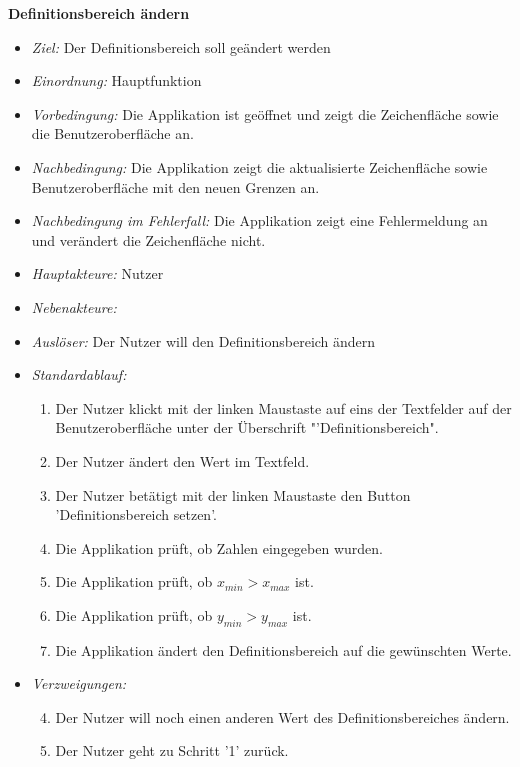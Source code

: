 \textbf{Definitionsbereich \"andern}
  \begin{itemize}
  \item \textit{Ziel:} Der Definitionsbereich soll ge\"andert werden
  \item \textit{Einordnung:}  Hauptfunktion
  \item \textit{Vorbedingung:} Die Applikation ist ge\"offnet und zeigt die Zeichenfl\"ache sowie die Benutzeroberfl\"ache an.
  \item \textit{Nachbedingung:} Die Applikation zeigt die aktualisierte Zeichenfl\"ache sowie Benutzeroberfl\"ache mit den neuen Grenzen an.
  \item \textit{Nachbedingung im Fehlerfall:} Die Applikation zeigt eine Fehlermeldung an und ver\"andert die Zeichenfl\"ache nicht.
  \item \textit{Hauptakteure:} Nutzer
  \item \textit{Nebenakteure:}
  \item \textit{Ausl\"oser:} Der Nutzer will den Definitionsbereich \"andern
  \item \textit{Standardablauf:}
    \begin{enumerate}[label=(\arabic*)]
    \item Der Nutzer klickt mit der linken Maustaste auf eins der Textfelder auf der Benutzeroberfl\"ache unter der \"Uberschrift "'Definitionsbereich".
    \item Der Nutzer \"andert den Wert im Textfeld.
    \item Der Nutzer bet\"atigt mit der linken Maustaste den Button 'Definitionsbereich setzen'.
    \item Die Applikation pr\"uft, ob Zahlen eingegeben wurden.
    \item Die Applikation pr\"uft, ob $ x_{min} > x_{max}$ ist. 
    \item Die Applikation pr\"uft, ob $ y_{min} > y_{max}$ ist.
    \item Die Applikation \"andert den Definitionsbereich auf die gew\"unschten Werte.
    \end{enumerate}
      \item \textit{Verzweigungen:}
     \begin{enumerate}[label=(2a\arabic*)]            	\setcounter{enumii}{3}
      \item Der Nutzer will noch einen anderen Wert des Definitionsbereiches \"andern.
   	\item Der Nutzer geht zu Schritt '1' zur\"uck.
                \end{enumerate}      

\end{itemize}
